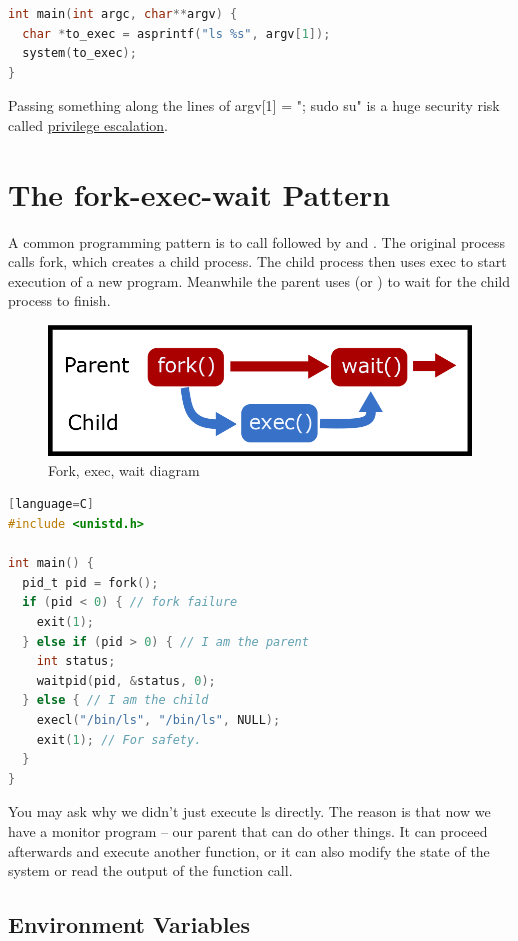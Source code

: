 \begin{lstlisting}[language=C]
int main(int argc, char**argv) {
  char *to_exec = asprintf("ls %s", argv[1]);
  system(to_exec);
}
\end{lstlisting}

Passing something along the lines of argv[1] = "; sudo su" is a huge security risk called \href{https://en.wikipedia.org/wiki/Privilege\_escalation}{privilege escalation}.

\section{The fork-exec-wait Pattern}

A common programming pattern is to call  followed by  and .
The original process calls fork, which creates a child process.
The child process then uses exec to start execution of a new program.
Meanwhile the parent uses  (or ) to wait for the child process to finish.

\begin{figure}[H]
\centering
\includegraphics[width=.7\textwidth]{processes/drawings/fork_exec_wait.png}
\caption{Fork, exec, wait diagram}
\end{figure}

\begin{lstlisting}[language=C][language=C]
#include <unistd.h>

int main() {
  pid_t pid = fork();
  if (pid < 0) { // fork failure
    exit(1);
  } else if (pid > 0) { // I am the parent
    int status;
    waitpid(pid, &status, 0);
  } else { // I am the child
    execl("/bin/ls", "/bin/ls", NULL);
    exit(1); // For safety.
  }
}
\end{lstlisting}

You may ask why we didn't just execute ls directly.
The reason is that now we have a monitor program -- our parent that can do other things.
It can proceed afterwards and execute another function, or it can also modify the state of the system or read the output of the function call.

\subsection{Environment Variables}

